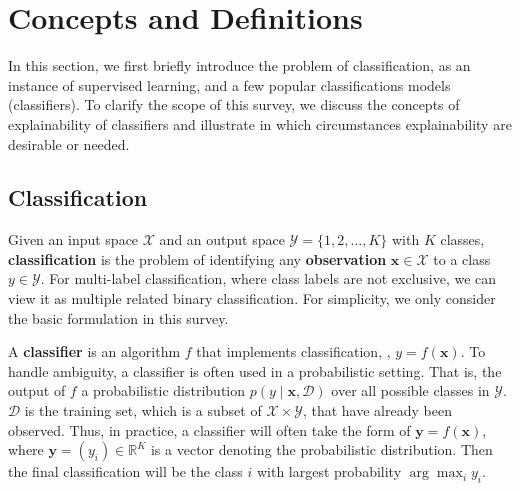 \chapter{Concepts and Definitions}\label{sec-comcepts}

In this section, we first briefly introduce the problem of classification, as an instance of supervised learning, and a few popular classifications models (classifiers). To clarify the scope of this survey, we discuss the concepts of explainability of classifiers and illustrate in which circumstances explainability are desirable or needed. 




\section{Classification} \label{sec:classifier-classification}

Given an input space $\mathcal{X}$ and an output space $\mathcal{Y}=\{1, 2, ..., K\}$ with $K$ classes, \textbf{classification} is the problem of identifying any \textbf{observation} $\mathbf{x}\in\mathcal{X}$ to a class $y\in\mathcal{Y}$. For multi-label classification, where class labels are not exclusive, we can view it as multiple related binary classification. For simplicity, we only consider the basic formulation in this survey. 

A \textbf{classifier} is an algorithm $f$ that implements classification, \ie, $y = f(\mathbf{x})$. To handle ambiguity, a classifier is often used in a probabilistic setting. That is, the output of $f$ a probabilistic distribution $p(y\mid \mathbf{x}, \mathcal{D})$ over all possible classes in $\mathcal{Y}$. $\mathcal{D}$ is the training set, which is a subset of $\mathcal{X}\times\mathcal{Y}$, that have already been observed. Thus, in practice, a classifier will often take the form of $\mathbf{y} = f(\mathbf{x})$, where $\mathbf{y}=(y_i)\in\mathbb{R}^K$ is a vector denoting the probabilistic distribution. Then the final classification will be the class $i$ with largest probability $\arg\max_{i}{y_i}$.

